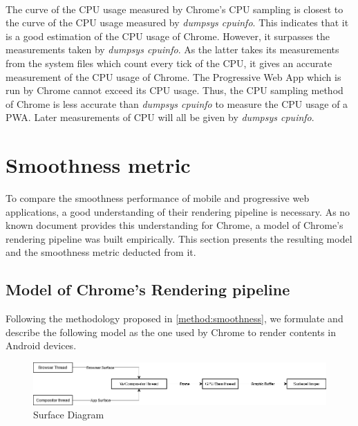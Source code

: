 \documentclass{kththesis}
\begin{document}
\paragraph{}
The curve of the CPU usage measured by Chrome's CPU sampling is closest to the curve of the CPU usage measured by \textit{dumpsys cpuinfo}. This indicates that it is a good estimation of the CPU usage of Chrome. However, it surpasses the measurements taken by \textit{dumpsys cpuinfo}. As the latter takes its measurements from the system files which count every tick of the CPU, it gives an accurate measurement of the CPU usage of Chrome. The Progressive Web App which is run by Chrome cannot exceed its CPU usage. Thus, the CPU sampling method of Chrome is less accurate than \textit{dumpsys cpuinfo} to measure the CPU usage of a PWA. Later measurements of CPU will all be given by \textit{dumpsys cpuinfo}.

\section{Smoothness metric}

To compare the smoothness performance of mobile and progressive web applications, a good understanding of their rendering pipeline is necessary. As no known document provides this understanding for Chrome, a model of Chrome's rendering pipeline was built empirically. This section presents the resulting model and the smoothness metric deducted from it. 

\subsection{Model of Chrome's Rendering pipeline}
\label{results:chrome_model}

Following the methodology proposed in \autoref{method:smoothness}, we formulate and describe the following model as the one used by Chrome to render contents in Android devices.\newline

\begin{figure}[h]
    \centering
    \includegraphics[width=13cm]{kththesis/Figures/surface_diagram.png}
    \caption{Surface Diagram}
    \label{fig:surface_diagram}
\end{figure}
\end{document}
